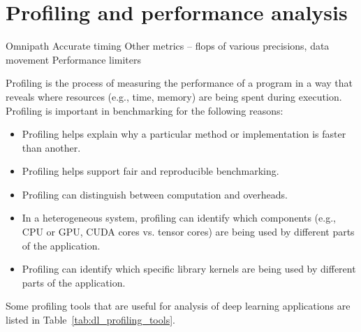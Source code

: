 \section{Profiling and performance analysis}
\label{sec:prof}

Omnipath
Accurate timing
Other metrics – flops of various precisions, data movement
Performance limiters

Profiling is the process of measuring the performance of a program in a way that reveals where resources (e.g., time, memory) are being spent during execution. Profiling is important in benchmarking for the following reasons:


\begin{itemize}
    \item Profiling helps explain why a particular method or implementation is faster than another.
    \item Profiling helps support fair and reproducible benchmarking.
    \item Profiling can distinguish between computation and overheads.
    \item In a heterogeneous system, profiling can identify which components (e.g., CPU or GPU, CUDA cores vs. tensor cores) are being used by different parts of the application.
    \item Profiling can identify which specific library kernels are being used by different parts of the application.
\end{itemize}

Some profiling tools that are useful for analysis of deep learning applications are listed in Table~\ref{tab:dl_profiling_tools}.



